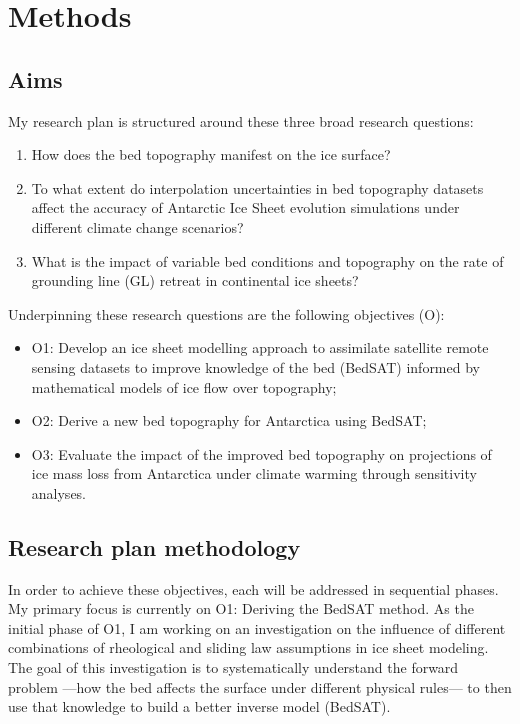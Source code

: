 \chapter{Methods}
\section{Aims}
 My research plan is structured around these three broad research questions:
\begin{enumerate}

    \item How does the bed topography manifest on the ice surface?

    \item To what extent do interpolation uncertainties in bed topography datasets affect the accuracy of Antarctic Ice Sheet evolution simulations under different climate change scenarios?

    \item What is the impact of variable bed conditions and topography on the rate of grounding line (GL) retreat in continental ice sheets?

\end{enumerate}

Underpinning these research questions are the following objectives (O):
\begin{itemize}
    \item{O1:} Develop an ice sheet modelling approach to assimilate satellite remote sensing datasets to improve knowledge of the bed (BedSAT) informed by mathematical models of ice flow over topography;

    \item{O2:} Derive a new bed topography for Antarctica using BedSAT;

    \item{O3:} Evaluate the impact of the improved bed topography on projections of ice mass loss from Antarctica under climate warming through sensitivity analyses. 
\end{itemize}

\section{Research plan methodology}

In order to achieve these objectives, each will be addressed in sequential phases. My primary focus is currently on O1: Deriving the BedSAT method. As the initial phase of O1, I am working on an investigation on the influence of different combinations of rheological and sliding law assumptions in ice sheet modeling. The goal of this investigation is to systematically understand the forward problem —how the bed affects the surface under different physical rules— to then use that knowledge to build a better inverse model (BedSAT).

